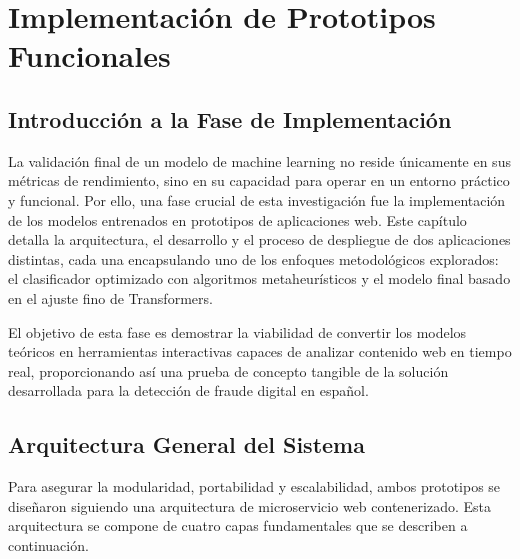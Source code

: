 \chapter{Implementación de Prototipos Funcionales}
\label{chap:implementacion}

\section{Introducción a la Fase de Implementación}
La validación final de un modelo de machine learning no reside únicamente en sus métricas de rendimiento, sino en su capacidad para operar en un entorno práctico y funcional. Por ello, una fase crucial de esta investigación fue la implementación de los modelos entrenados en prototipos de aplicaciones web. Este capítulo detalla la arquitectura, el desarrollo y el proceso de despliegue de dos aplicaciones distintas, cada una encapsulando uno de los enfoques metodológicos explorados: el clasificador optimizado con algoritmos metaheurísticos y el modelo final basado en el ajuste fino de Transformers.

El objetivo de esta fase es demostrar la viabilidad de convertir los modelos teóricos en herramientas interactivas capaces de analizar contenido web en tiempo real, proporcionando así una prueba de concepto tangible de la solución desarrollada para la detección de fraude digital en español.

\section{Arquitectura General del Sistema}
Para asegurar la modularidad, portabilidad y escalabilidad, ambos prototipos se diseñaron siguiendo una arquitectura de microservicio web contenerizado. Esta arquitectura se compone de cuatro capas fundamentales que se describen a continuación.

